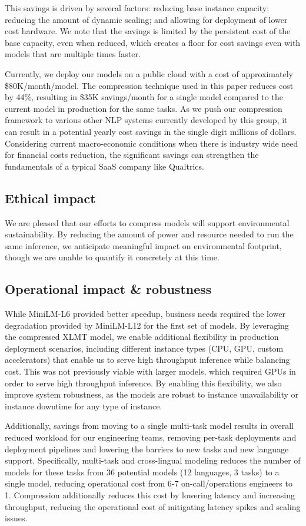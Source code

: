 \documentclass[letterpaper]{article} %
\begin{document}
This savings is driven by several factors: reducing base instance capacity; reducing the amount of dynamic scaling; and allowing for deployment of lower cost hardware.
We note that the savings is limited by the persistent cost of the base capacity, even when reduced, which creates a floor for cost savings even with models that are multiple times faster.

Currently, we deploy our models on a public cloud with a cost of approximately \$80K/month/model.
The compression technique used in this paper reduces cost by 44\%, resulting in \$35K savings/month for a single model compared to the current model in production for the same tasks.
As we push our compression framework to various other NLP systems currently developed by this group, it can result in a potential yearly cost savings in the single digit millions of dollars.
Considering current macro-economic conditions when there is industry wide need for financial costs reduction, the significant savings can strengthen the fundamentals of a typical SaaS company like Qualtrics. 

\subsection*{Ethical impact}
We are pleased that our efforts to compress models will support environmental sustainability.
By reducing the amount of power and resource needed to run the same inference, we anticipate meaningful impact on environmental footprint, though we are unable to quantify it concretely at this time.

\subsection*{Operational impact \& robustness}
While MiniLM-L6 provided better speedup, business needs required the lower degradation provided by MiniLM-L12 for the first set of models.
By leveraging the compressed XLMT model, we enable additional flexibility in production deployment scenarios, including different instance types (CPU, GPU, custom accelerators) that enable us to serve high throughput inference while balancing cost.
This was not previously viable with larger models, which required GPUs in order to serve high throughput inference.
By enabling this flexibility, we also improve system robustness, as the models are robust to instance unavailability or instance downtime for any type of instance.

Additionally, savings from moving to a single multi-task model results in overall reduced workload for our engineering teams, removing per-task deployments and deployment pipelines and lowering the barriers to new tasks and new language support.
Specifically, multi-task and cross-lingual modeling reduces the number of models for these tasks from 36 potential models (12 languages, 3 tasks) to a single model, reducing operational cost from 6-7 on-call/operations engineers to 1.
Compression additionally reduces this cost by lowering latency and increasing throughput, reducing the operational cost of mitigating latency spikes and scaling issues.
\end{document}
